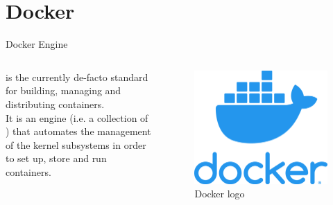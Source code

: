 
\section{Docker}
\graphicspath{{figs/section2/}}

\begin{frame}{Docker Engine}
\begin{columns}
   is the currently de-facto standard for building, managing and distributing  containers.\\
  It is an engine (i.e. a collection of ) that automates the management of the kernel subsystems in order to set up, store and run containers.

  \begin{figure}
    \centering
    \label{fig:docker}
    \includegraphics[scale=.2]{docker.png}
    \caption{Docker logo}
  \end{figure}
\end{columns}
\end{frame}
